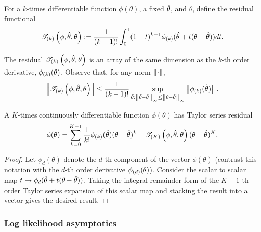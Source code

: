 \begin{defn}
%
For a $k$-times differentiable function $\phi(\theta)$, a fixed $\hat\theta$,
and $\theta$, define the residual functional
%
\begin{align*}
%
\tresid{k}{\phi, \thetahat, \theta} :=
    \frac{1}{(k-1)!} \int_0^1 (1 - t)^{k-1}
        \phigrad{k}(\thetahat + t (\theta - \thetahat)) dt.
%
\end{align*}
%
\end{defn}
%
The residual $\mathscr{T}_{(k)}\left(\phi, \hat\theta, \theta\right)$ is an array of the same
dimension as the $k$-th order derivative, $\phi_{(k)}(\theta)$.  Observe that,
for any norm $\left\Vert \cdot\right\Vert$,
%
\begin{align*}
    \left\Vert \mathscr{T}_{(k)}\left(\phi, \hat\theta, \theta\right)\right\Vert \le
        \frac{1}{(k-1)!} \sup_{\tilde{\theta}: \left\Vert \tilde{\theta} - \hat\theta\right\Vert_\infty \le
                                          \left\Vert \theta - \hat\theta\right\Vert_\infty}
                            \left\Vert \phi_{(k)}(\tilde{\theta})\right\Vert.
\end{align*}
%
\begin{lem}
%
A $K$-times continuously differentiable function $\phi(\theta)$ has Taylor
series residual
%
\begin{align*}
\phi(\theta) =
    \sum_{k=0}^{K-1} \frac{1}{k!} \phi_{(k)}(\hat\theta) (\theta - \hat\theta)^k +
    \mathscr{T}_{(K)}\left(\phi, \hat\theta, \theta\right) (\theta - \hat\theta)^K.
\end{align*}
%
\begin{proof}
%
Let $\phi_d(\theta)$ denote the $d$-th component of the vector $\phi(\theta)$
(contrast this notation with the $d$-th order derivative
$\phi_{(d)}(\theta)$). Consider the scalar to scalar map $t \mapsto
\phi_d(\hat\theta + t (\theta - \hat\theta))$. Taking the integral remainder form
of the $K - 1$-th order Taylor series expansion of this scalar map
\citep[Appendix B.2]{dudley:2018:analysis} and stacking the result into a vector
gives the desired result.
%
\end{proof}
%
\end{lem}




\subsubsection{Log likelihood asymptotics}

